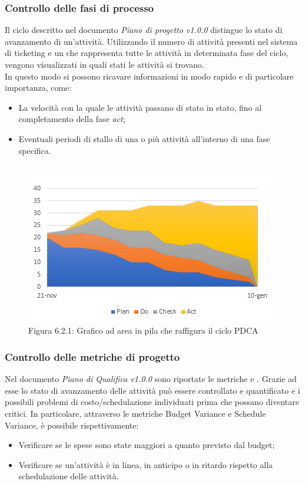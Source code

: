 \subsubsection{Controllo delle fasi di processo}
Il ciclo  descritto nel documento \emph{Piano di progetto v1.0.0} distingue lo stato di avanzamento di un'attività. Utilizzando il numero di attività presenti nel sistema di ticketing e un  che rappresenta tutte le attività in determinata fase del ciclo, vengono visualizzati in quali stati le attività si trovano. \\
In questo modo si possono ricavare informazioni in  modo rapido e di particolare importanza, come:
\begin{itemize}
\item{La velocità con la quale le attività passano di stato in stato, fino al completamento della fase \emph{act};}
\item{Eventuali periodi di stallo di una o più attività all'interno di una fase specifica.} \\ \\
\end{itemize}  
\begin{figure} [H]
	\centering
	\includegraphics[scale=1]{../PianoDiProgetto/Img/Grafico_PDCA.png}
	\caption{Figura 6.2.1: Grafico ad area in pila che raffigura il ciclo PDCA}\label{}
\end{figure} 
\subsubsection{Controllo delle metriche di progetto}
Nel documento \emph{Piano di Qualifica v1.0.0} sono riportate le metriche  e . Grazie ad esse lo stato di avanzamento delle attività può essere controllato e quantificato e i possibili problemi di costo/schedulazione individuati prima che possano diventare critici. In particolare, attraverso le metriche Budget Variance e Schedule Variance, è possibile rispettivamente:
\begin{itemize}
\item{Verificare se le spese sono state maggiori a quanto previsto dal budget;}
\item{Verificare se un'attività è in linea, in anticipo o in ritardo rispetto alla schedulazione delle attività.}
\end{itemize}

